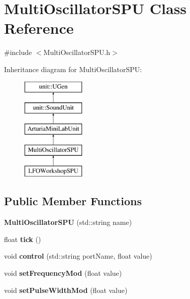 \hypertarget{classMultiOscillatorSPU}{\section{Multi\-Oscillator\-S\-P\-U Class Reference}
\label{classMultiOscillatorSPU}
}


{\ttfamily \#include $<$Multi\-Oscillator\-S\-P\-U.\-h$>$}

Inheritance diagram for Multi\-Oscillator\-S\-P\-U\-:\begin{figure}[H]
\begin{center}
\leavevmode
\includegraphics[height=5.000000cm]{classMultiOscillatorSPU}
\end{center}
\end{figure}
\subsection*{Public Member Functions}
\begin{DoxyCompactItemize}
\item 
\hypertarget{classMultiOscillatorSPU_a3c7fc8e1067fb1b025551702344597a6}{{\bfseries Multi\-Oscillator\-S\-P\-U} (std\-::string name)}\label{classMultiOscillatorSPU_a3c7fc8e1067fb1b025551702344597a6}

\item 
\hypertarget{classMultiOscillatorSPU_ac5004f7b5bfa6025abee24b53abdd69f}{float {\bfseries tick} ()}\label{classMultiOscillatorSPU_ac5004f7b5bfa6025abee24b53abdd69f}

\item 
\hypertarget{classMultiOscillatorSPU_ab20794e0a79b779f35b36582cf4f65d0}{void {\bfseries control} (std\-::string port\-Name, float value)}\label{classMultiOscillatorSPU_ab20794e0a79b779f35b36582cf4f65d0}

\item 
\hypertarget{classMultiOscillatorSPU_a7040cf4388fe9bdaf624b707973241d0}{void {\bfseries set\-Frequency\-Mod} (float value)}\label{classMultiOscillatorSPU_a7040cf4388fe9bdaf624b707973241d0}

\item 
\hypertarget{classMultiOscillatorSPU_a42f7950c4fac230d97f43fa22587064e}{void {\bfseries set\-Pulse\-Width\-Mod} (float value)}\label{classMultiOscillatorSPU_a42f7950c4fac230d97f43fa22587064e}

\end{DoxyCompactItemize}
